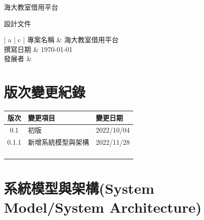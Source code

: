 \documentclass{article}
\begin{document}
\begin{titlepage}
	\centering

	{\huge 海大教室借用平台}

	\vfill

	{\huge 設計文件}

	\vfill

	\begin{Large}
		\begin{center}
			\begin{tabular}{| a | c |}
				\hline
				專案名稱 & 海大教室借用平台               \\ \hline
				撰寫日期 & \today                 \\ \hline
				發展者  &  \\ \hline
			\end{tabular}
		\end{center}
	\end{Large}
\end{titlepage}


\section*{版次變更紀錄}

\begin{tabularx}{\textwidth}{| c | X | X |}
	\rowcolor{LightGray}
	\hline
	版次    & 變更項目      & 變更日期       \\ \hline
	0.1   & 初版        & 2022/10/04 \\ \hline
	0.1.1 & 新增系統模型與架構 & 2022/11/28 \\ \hline
	      &           &            \\ \hline
	      &           &            \\ \hline
	      &           &            \\ \hline
	      &           &            \\ \hline
\end{tabularx}

\newpage

\begin{center}
	\tableofcontents
\end{center}

\newpage

\section[系統模型與架構(SYSTEM MODEL/SYSTEM ARCHITECTURE)]{系統模型與架構(System Model/System Architecture)}
\end{document}
